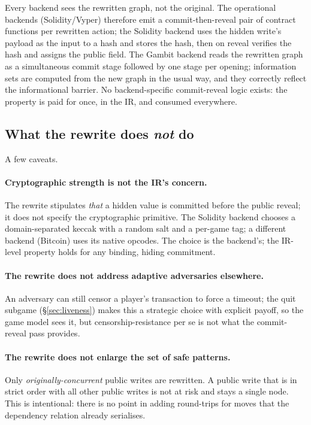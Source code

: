 Every backend sees the rewritten graph, not the original.  The
operational backends (Solidity/Vyper) therefore emit a
commit-then-reveal pair of contract functions per rewritten
action; the Solidity backend uses the hidden write's payload as
the input to a hash and stores the hash, then on reveal verifies
the hash and assigns the public field.  The Gambit backend reads
the rewritten graph as a simultaneous commit stage followed by one
stage per opening; information sets are computed
from the new graph in the usual way, and they correctly reflect
the informational barrier.  No backend-specific commit-reveal
logic exists: the property is paid for once, in the IR, and
consumed everywhere.

\subsection{What the rewrite does \emph{not} do}

A few caveats.

\paragraph{Cryptographic strength is not the IR's concern.}  The
rewrite stipulates \emph{that} a hidden value is committed before
the public reveal; it does not specify the cryptographic primitive.
The Solidity backend chooses a domain-separated keccak with a
random salt and a per-game tag; a different backend (Bitcoin) uses
its native opcodes.  The choice is the backend's; the IR-level
property holds for any binding, hiding commitment.

\paragraph{The rewrite does not address adaptive adversaries
elsewhere.}  An adversary can still censor a player's transaction
to force a timeout; the quit subgame (\S\ref{sec:liveness})
makes this a strategic choice with explicit payoff, so the game
model sees it, but censorship-resistance per se is not what the
commit-reveal pass provides.

\paragraph{The rewrite does not enlarge the set of safe
patterns.}  Only \emph{originally-concurrent} public writes are
rewritten.  A public write that is in strict order with all other
public writes is not at risk and stays a single node.  This is
intentional: there is no point in adding round-trips for moves
that the dependency relation already serialises.

